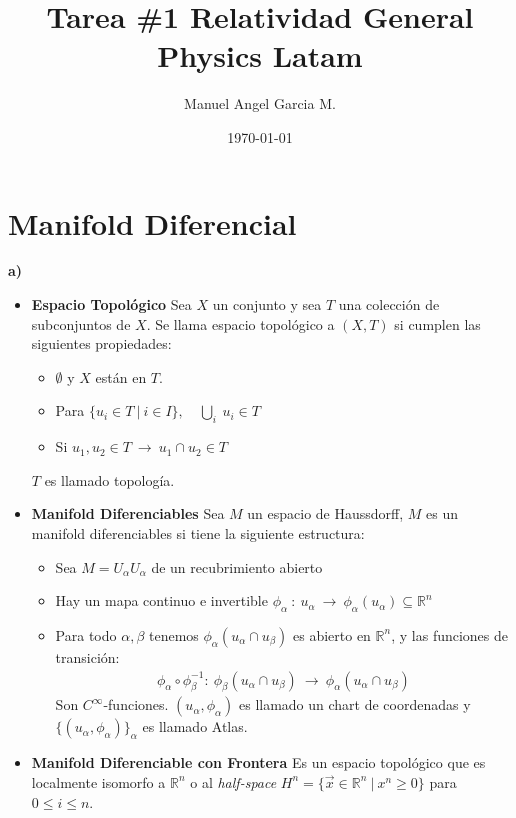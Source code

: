 \documentclass{article}
\title{Tarea \#1 Relatividad General Physics Latam }
\author{Manuel Angel Garcia M.}
\date{\today}
\begin{document}
\maketitle

\section{Manifold Diferencial}

\textbf{a)} 
\begin{itemize}
  \item \textbf{Espacio Topológico } Sea $ X  $ un conjunto y sea $ T  $ una colección de subconjuntos de $ X  $. Se llama espacio topológico a $ (X,T) $ si cumplen las siguientes propiedades:
    \begin{itemize}
      \item $ \emptyset $ y $ X  $ están en $ T  $.
      \item Para $ \{u_i \in T \ | \ i\in I \}, \quad \underset{i }{\bigcup}\  u_i \in T $
      \item Si $ u_1,u_2 \in T \ \rightarrow \ u_1 \cap u_2 \in T $
    \end{itemize}
    $ T  $ es llamado topología.
  \item \textbf{Manifold Diferenciables } Sea $ M $ un espacio de Haussdorff, $ M  $ es un manifold diferenciables si tiene la siguiente estructura:
    \begin{itemize}
      \item Sea $ M = U_\alpha U_\alpha $ de un recubrimiento abierto
      \item Hay un mapa continuo e invertible $ \phi_\alpha \ : \ u_\alpha \ \rightarrow \ \phi_\alpha(u_\alpha) \subseteq \mathbb{R}^n $
      \item Para todo $ \alpha,\beta $ tenemos $ \phi_\alpha(u_\alpha\cap u_\beta) $ es abierto en $ \mathbb{R}^n  $, y las funciones de transición: 
        \begin{gather*}
          \phi_\alpha \circ \phi_\beta ^ {-1 }: \ \phi_\beta(u_\alpha \cap u_\beta) \ \rightarrow \ \phi_\alpha(u_\alpha \cap u_\beta)
        \end{gather*}
        Son $ C^\infty $-funciones. $ (u_\alpha, \phi_\alpha) $ es llamado un chart de coordenadas y $ \{(u_\alpha, \phi_\alpha)\}_\alpha $ es llamado Atlas.
    \end{itemize}
  \item \textbf{Manifold Diferenciable con Frontera} Es un espacio topológico que es localmente isomorfo a $ \mathbb{R}^n  $ o al \textit{half-space} $ H^n = \{\vec x \in \mathbb{R}^n \ | \ x^n \geq 0\} $ para $ 0\leq i \leq n $.
\end{itemize}
\end{document}
